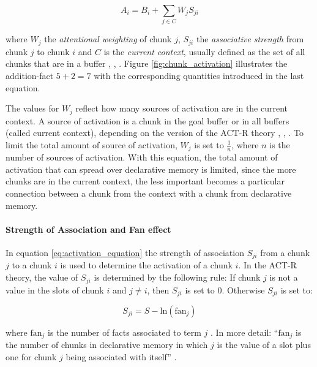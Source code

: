 \begin{equation}
\label{eq:activation_equation}
 A_i = B_i + \sum_{j \in C}{W_j S_{ji}}
\end{equation}

where $W_j$ the \emph{attentional weighting} of chunk $j$, $S_{ji}$ the \emph{associative strength} from chunk $j$ to chunk $i$ and $C$ is the \emph{current context}, usually defined as the set of all chunks that are in a buffer \cite[p. 1042]{anderson_integrated_2004}, \cite[p. 33]{taatgen_modeling_2006}, \cite[unit 5]{actr_tutorial}. Figure \ref{fig:chunk_activation} illustrates the addition-fact $5 + 2 = 7$ with the corresponding quantities introduced in the last equation. 

The values for $W_j$ reflect how many sources of activation are in the current context. A source of activation is a chunk in the goal buffer or in all buffers (called current context), depending on the version of the ACT-R theory \cite[p. 1042]{anderson_integrated_2004}, \cite[p. 33]{taatgen_modeling_2006}, \cite[unit 5, p. 1]{actr_tutorial}. To limit the total amount of source of activation, $W_j$ is set to $\frac{1}{n}$, where $n$ is the number of sources of activation. With this equation, the total amount of activation that can spread over declarative memory is limited, since the more chunks are in the current context, the less important becomes a particular connection between a chunk from the context with a chunk from declarative memory.

\paragraph{Strength of Association and Fan effect}

In equation \eqref{eq:activation_equation} the strength of association $S_{ji}$ from a chunk $j$ to a chunk $i$ is used to determine the activation of a chunk $i$.  In the ACT-R theory, the value of $S_{ji}$ is determined by the following rule: If chunk $j$ is not a value in the slots of chunk $i$ and $j \neq i$, then $S_{ji}$ is set to 0. Otherwise $S_{ji}$ is set to: 

\begin{equation}
\label{eq:assoc_strength}
S_{ji} = S - \mathrm{ln}(\mathrm{fan}_j)
\end{equation}

where $\mathrm{fan}_j$ is the number of facts associated to term $j$ \cite[p. 1042]{anderson_implications_2000}. In more detail: ``$\mathrm{fan}_j$ is the number of chunks in declarative memory in which $j$ is the value of a slot plus one for chunk $j$ being associated with itself'' \cite[unit 5, p. 2]{actr_tutorial}.  

